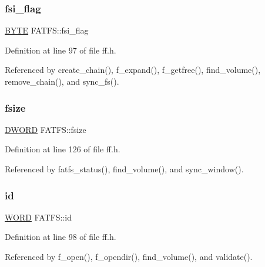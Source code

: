 \mbox{\label{structFATFS_a84e9cdc5a6a8e33ea7ec192058abf161}} 
\subsubsection{\texorpdfstring{fsi\+\_\+flag}{fsi\_flag}}
{\footnotesize\ttfamily \hyperlink{integer_8h_a4ae1dab0fb4b072a66584546209e7d58}{B\+Y\+TE} F\+A\+T\+F\+S\+::fsi\+\_\+flag}



Definition at line 97 of file ff.\+h.



Referenced by create\+\_\+chain(), f\+\_\+expand(), f\+\_\+getfree(), find\+\_\+volume(), remove\+\_\+chain(), and sync\+\_\+fs().

\mbox{\label{structFATFS_a53e9560659f14e66f306c2c444198bf3}} 
\subsubsection{\texorpdfstring{fsize}{fsize}}
{\footnotesize\ttfamily \hyperlink{integer_8h_ad342ac907eb044443153a22f964bf0af}{D\+W\+O\+RD} F\+A\+T\+F\+S\+::fsize}



Definition at line 126 of file ff.\+h.



Referenced by fatfs\+\_\+status(), find\+\_\+volume(), and sync\+\_\+window().

\mbox{\label{structFATFS_a417095d7c20d56d417dc0998e0dd5a5c}} 
\subsubsection{\texorpdfstring{id}{id}}
{\footnotesize\ttfamily \hyperlink{integer_8h_a197942eefa7db30960ae396d68339b97}{W\+O\+RD} F\+A\+T\+F\+S\+::id}



Definition at line 98 of file ff.\+h.



Referenced by f\+\_\+open(), f\+\_\+opendir(), find\+\_\+volume(), and validate().

